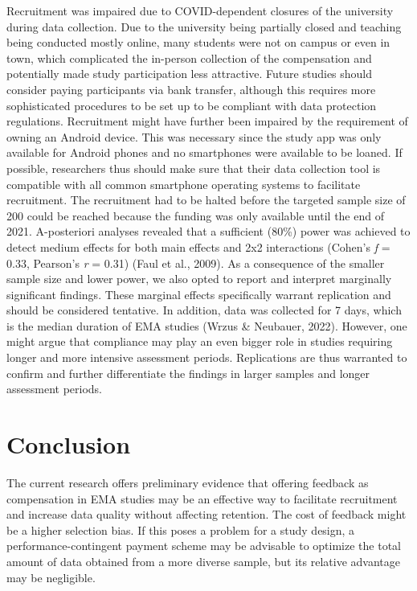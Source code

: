 \documentclass[authordate, empirical]{jote-new-article}
\begin{document}
	Recruitment was impaired due to COVID-dependent closures of the university during data collection. Due to the university being partially closed and teaching being conducted mostly online, many students were not on campus or even in town, which complicated the in-person collection of the compensation and potentially made study participation less attractive. Future studies should consider paying participants via bank transfer, although this requires more sophisticated procedures to be set up to be compliant with data protection regulations. Recruitment might have further been impaired by the requirement of owning an Android device. This was necessary since the study app was only available for Android phones and no smartphones were available to be loaned. If possible, researchers thus should make sure that their data collection tool is compatible with all common smartphone operating systems to facilitate recruitment. The recruitment had to be halted before the targeted sample size of 200 could be reached because the funding was only available until the end of 2021. A-posteriori analyses revealed that a sufficient (80\%) power was achieved to detect medium effects for both main effects and 2x2 interactions (Cohen's \emph{f} = 0.33, Pearson's \emph{r} = 0.31) (Faul et al., 2009). As a consequence of the smaller sample size and lower power, we also opted to report and interpret marginally significant findings. These marginal effects specifically warrant replication and should be considered tentative. In addition, data was collected for 7 days, which is the median duration of EMA studies (Wrzus \& Neubauer, 2022). However, one might argue that compliance may play an even bigger role in studies requiring longer and more intensive assessment periods. Replications are thus warranted to confirm and further differentiate the findings in larger samples and longer assessment periods.



	\section{\textbf{Conclusion}}



	The current research offers preliminary evidence that offering feedback as compensation in EMA studies may be an effective way to facilitate recruitment and increase data quality without affecting retention. The cost of feedback might be a higher selection bias. If this poses a problem for a study design, a performance-contingent payment scheme may be advisable to optimize the total amount of data obtained from a more diverse sample, but its relative advantage may be negligible.
\end{document}
